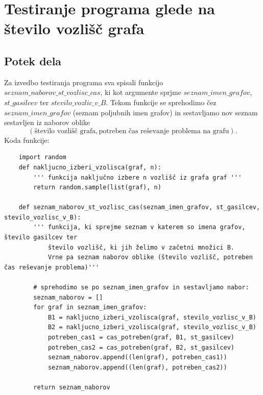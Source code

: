 \documentclass[a4paper, 12pt]{article}
\begin{document}
\pagebreak

\overfullrule=0pt
\section{Testiranje programa glede na število vozlišč grafa}

\subsection{Potek dela}

Za izvedbo testiranja programa sva spisali funkcijo $seznam\_naborov\_st\_vozlisc\_cas$, ki
kot argumente sprjme $seznam\_imen\_grafov$, $st\_gasilcev$ ter $stevilo\_vozlic\_v\_B$. Tekom
funkcije se sprehodimo čez $seznam\_imen\_grafov$ (seznam poljubnih imen grafov) in sestavljamo 
nov seznam sestavljen iz naborov oblike  
$$\left( \text{število vozlišč grafa}, \text{potreben čas reševanje problema na grafu} \right).$$
Koda funkcije:

\begin{scriptsize}
\begin{verbatim}
    import random
    def nakljucno_izberi_vzolisca(graf, n):
        ''' funkcija naključno izbere n vozlišč iz grafa graf '''
        return random.sample(list(graf), n)

    def seznam_naborov_st_vozlisc_cas(seznam_imen_grafov, st_gasilcev, stevilo_vozlisc_v_B):
        ''' funkcija, ki sprejme seznam v katerem so imena grafov, število gasilcev ter 
            število vozlišč, ki jih želimo v začetni množici B.
            Vrne pa seznam naborov oblike (število vozlišč, potreben čas reševanje problema)'''
        
        # sprehodimo se po seznam_imen_grafov in sestavljamo nabor:
        seznam_naborov = []
        for graf in seznam_imen_grafov:
            B1 = nakljucno_izberi_vzolisca(graf, stevilo_vozlisc_v_B)
            B2 = nakljucno_izberi_vzolisca(graf, stevilo_vozlisc_v_B)
            potreben_cas1 = cas_potreben(graf, B1, st_gasilcev)
            potreben_cas2 = cas_potreben(graf, B2, st_gasilcev)
            seznam_naborov.append((len(graf), potreben_cas1))
            seznam_naborov.append((len(graf), potreben_cas2))
        
        return seznam_naborov
\end{verbatim}
\end{scriptsize}
\end{document}
